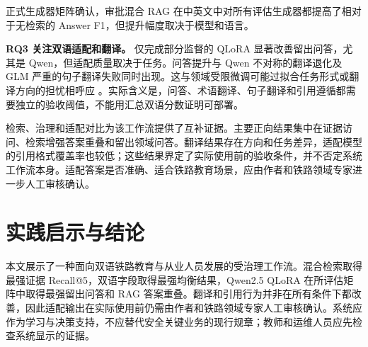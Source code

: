 正式生成器矩阵确认，审批混合 RAG 在中英文中对所有评估生成器都提高了相对于无检索的 Answer F1，但提升幅度取决于模型和语言。

\textbf{RQ3 关注双语适配和翻译。} 仅完成部分监督的 QLoRA 显著改善留出问答，尤其是 Qwen，但适配质量取决于任务。问答提升与 Qwen 不对称的翻译退化及 GLM 严重的句子翻译失败同时出现。这与领域受限微调可能过拟合任务形式或翻译方向的担忧相呼应 \citep{hu2024translation,vieira2024translation}。实际含义是，问答、术语翻译、句子翻译和引用遵循都需要独立的验收阈值，不能用汇总双语分数证明可部署。

检索、治理和适配对比为该工作流提供了互补证据。主要正向结果集中在证据访问、检索增强答案重叠和留出领域问答。翻译结果存在方向和任务差异，适配模型的引用格式覆盖率也较低；这些结果界定了实际使用前的验收条件，并不否定系统工作流本身。适配答案是否准确、适合铁路教育场景，应由作者和铁路领域专家进一步人工审核确认。

\section{实践启示与结论}

本文展示了一种面向双语铁路教育与从业人员发展的受治理工作流。混合检索取得最强证据 Recall@5，双语字段取得最强均衡结果，Qwen2.5 QLoRA 在所评估矩阵中取得最强留出问答和 RAG 答案重叠。翻译和引用行为并非在所有条件下都改善，因此适配输出在实际使用前仍需由作者和铁路领域专家人工审核确认。系统应作为学习与决策支持，不应替代安全关键业务的现行规章；教师和运维人员应先检查系统显示的证据。

